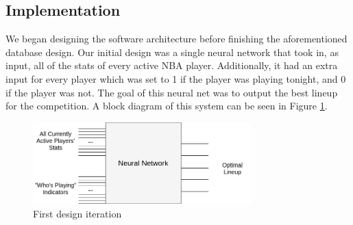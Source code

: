 \subsection{Implementation}
We began designing the software architecture before finishing the aforementioned database design. Our initial design was a single neural network that took in, as input, all of the stats of every active NBA player. Additionally, it had an extra input for every player which was set to 1 if the player was playing tonight, and 0 if the player was not. The goal of this neural net was to output the best lineup for the competition. A block diagram of this system can be seen in Figure \ref{fig:first_iteration}.
\begin{figure}[ht]
    \centering
    \includegraphics[width=0.75\textwidth]{figures/first_iteration}
    \caption{First design iteration}
    \label{fig:first_iteration}
\end{figure}
 

